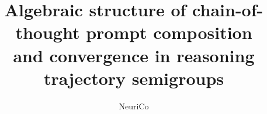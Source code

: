 \documentclass{amsart}
\title[CoT Semigroups]{Algebraic structure of chain-of-thought prompt composition\\
and convergence in reasoning trajectory semigroups}
\author{NeuriCo}
\theoremstyle{definition}
\theoremstyle{remark}
\numberwithin{equation}{section}
\begin{document}
\begin{abstract}

\end{abstract}

\maketitle









\end{document}
